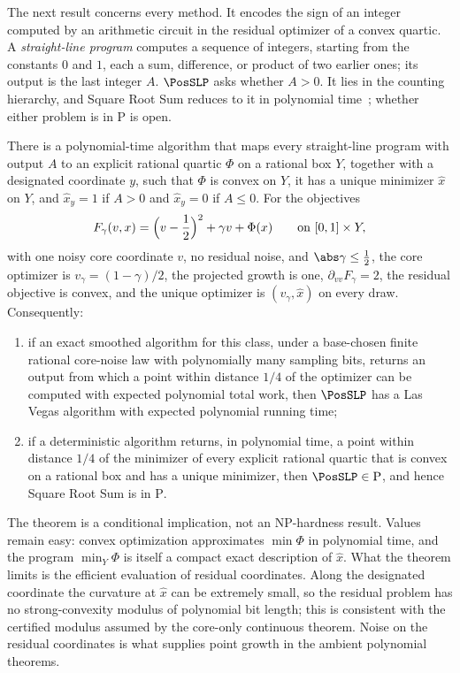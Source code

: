 The next result concerns every method. It encodes the sign of an integer
computed by an arithmetic circuit in the residual optimizer of a convex
quartic. A \emph{straight-line program} computes a sequence of integers,
starting from the constants $0$ and $1$, each a sum, difference, or product
of two earlier ones; its output is the last integer $A$. $\PosSLP$ asks
whether $A>0$. It lies in the counting hierarchy, and Square Root Sum
reduces to it in polynomial time~\citep{AllenderEtAl2009}; whether either
problem is in $\mathrm P$ is open.

\begin{theorem}\label{thm:lim:posslp}
There is a polynomial-time algorithm that maps every straight-line program
with output $A$ to an explicit rational quartic $\Phi$ on a rational box
$Y$, together with a designated coordinate $y$, such that $\Phi$ is convex on
$Y$, it has a unique minimizer $\hat x$ on $Y$, and $\hat x_y=1$ if $A>0$ and
$\hat x_y=0$ if $A\le0$. For the objectives
\[
 F_\gamma(v,x)=\Bigl(v-\frac12\Bigr)^2+\gamma v+\Phi(x)\qquad\text{on }[0,1]\times Y,
\]
with one noisy core coordinate $v$, no residual noise, and
$\abs\gamma\le\frac12$, the core optimizer is $v_\gamma=(1-\gamma)/2$, the
projected growth is one, $\partial_{vv}F_\gamma=2$, the residual objective
is convex, and the unique optimizer is $(v_\gamma,\hat x)$ on every draw.
Consequently:
\begin{enumerate}[label=(\alph*)]
\item if an exact smoothed algorithm for this class, under a base-chosen
finite rational core-noise law with polynomially many sampling bits,
returns an output from which a point within distance $1/4$ of the optimizer
can be computed with expected polynomial total work, then $\PosSLP$ has a
Las Vegas algorithm with expected polynomial running time;
\item if a deterministic algorithm returns, in polynomial time, a point
within distance $1/4$ of the minimizer of every explicit rational quartic
that is convex on a rational box and has a unique minimizer, then
$\PosSLP\in\mathrm P$, and hence Square Root Sum is in $\mathrm P$.
\end{enumerate}
\end{theorem}

The theorem is a conditional implication, not an NP-hardness result. Values
remain easy: convex optimization approximates $\min\Phi$ in polynomial time,
and the program $\min_Y\Phi$ is itself a compact exact description of
$\hat x$. What the theorem limits is the efficient evaluation of residual
coordinates. Along the designated coordinate the curvature at $\hat x$ can
be extremely small, so the residual problem has no strong-convexity
modulus of polynomial bit length; this is consistent with the certified
modulus assumed by the core-only continuous theorem. Noise on the residual
coordinates is what supplies point growth in the ambient polynomial
theorems.

